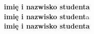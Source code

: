 \documentclass[12pt,a4paper,oneside]{article}
\theoremstyle{definition}
\numberwithin{equation}{section}
\begin{document}
\vspace*{20pt}
\noindent
\textbf{imię i nazwisko studenta} \\
\textbf{imię i nazwisko student}a \\
\textbf{imię i nazwisko studenta }\\

\renewcommand\refname{Literatura (jeżeli wymagana)}

%
%
%
\end{document}
